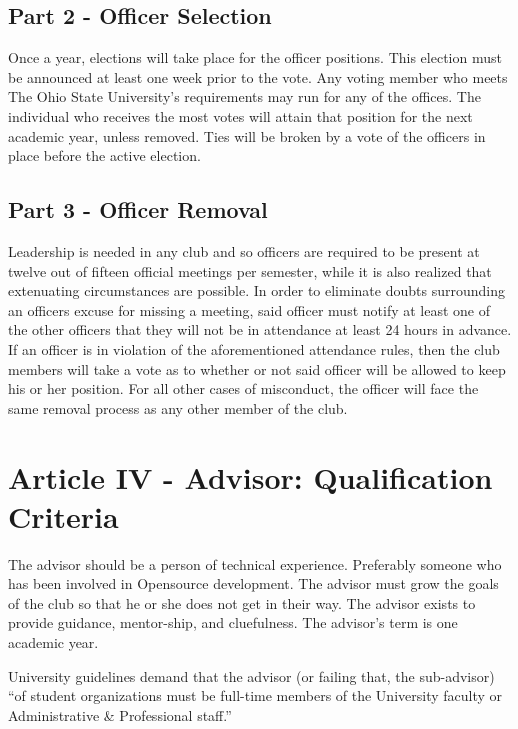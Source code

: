 \documentclass{article}
\begin{document}
	\subsection{Part 2 - Officer Selection}

	Once a year, elections will take place for the officer positions.  This
	election must be announced at least one week prior to the vote.  Any voting
	member who meets The Ohio State University's requirements may run for any
	of the offices.  The individual who receives the most votes will attain
	that position for the next academic year, unless removed.  Ties will be
	broken by a vote of the officers in place before the active election.

	\subsection{Part 3 - Officer Removal}

	Leadership is needed in any club and so officers are required to be present
	at twelve out of fifteen official meetings per semester, while it is also
	realized that extenuating circumstances are possible.  In order to
	eliminate doubts surrounding an officers excuse for missing a meeting, said
	officer must notify at least one of the other officers that they will not
	be in attendance at least 24 hours in advance.  If an officer is in
	violation of the aforementioned attendance rules, then the club members
	will take a vote as to whether or not said officer will be allowed to keep
	his or her position. For all other cases of misconduct, the officer will
	face the same removal process as any other member of the club.

	\section{Article IV - Advisor: Qualification Criteria}

	The advisor should be a person of technical experience. Preferably someone
	who has been involved in Opensource development. The advisor must grow the
	goals of the club so that he or she does not get in their way. The advisor
	exists to provide guidance, mentor-ship, and cluefulness. The advisor's
	term is one academic year.

	University guidelines demand that the advisor (or failing that, the
	sub-advisor) ``of student organizations must be full-time members of the
	University faculty or Administrative \& Professional staff.''
\end{document}
